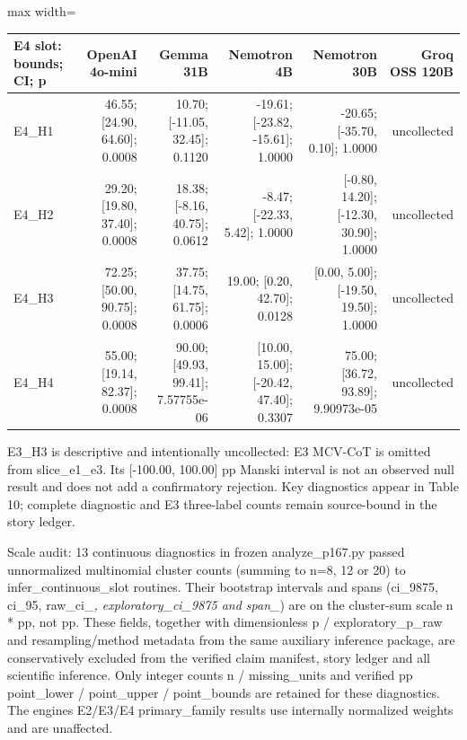 \documentclass[11pt,a4paper]{article}
\begin{document}
\begin{center}\begingroup\small\setlength{\tabcolsep}{4.5pt}\renewcommand{\arraystretch}{1.12}\begin{adjustbox}{max width=\textwidth}\begin{tabular}{lrrrrr}\toprule
\textbf{E4 slot: bounds; CI; p} & \textbf{OpenAI 4o-mini} & \textbf{Gemma 31B} & \textbf{Nemotron 4B} & \textbf{Nemotron 30B} & \textbf{Groq OSS 120B} \\ \midrule
E4\_\allowbreak{}H1 & 46.55; [24.90, 64.60]; 0.0008 & 10.70; [-11.05, 32.45]; 0.1120 & -19.61; [-23.82, -15.61]; 1.0000 & -20.65; [-35.70, 0.10]; 1.0000 & uncollected \\
E4\_\allowbreak{}H2 & 29.20; [19.80, 37.40]; 0.0008 & 18.38; [-8.16, 40.75]; 0.0612 & -8.47; [-22.33, 5.42]; 1.0000 & [-0.80, 14.20]; [-12.30, 30.90]; 1.0000 & uncollected \\
E4\_\allowbreak{}H3 & 72.25; [50.00, 90.75]; 0.0008 & 37.75; [14.75, 61.75]; 0.0006 & 19.00; [0.20, 42.70]; 0.0128 & [0.00, 5.00]; [-19.50, 19.50]; 1.0000 & uncollected \\
E4\_\allowbreak{}H4 & 55.00; [19.14, 82.37]; 0.0008 & 90.00; [49.93, 99.41]; 7.57755e-06 & [10.00, 15.00]; [-20.42, 47.40]; 0.3307 & 75.00; [36.72, 93.89]; 9.90973e-05 & uncollected \\
\bottomrule\end{tabular}\end{adjustbox}\endgroup\end{center}

E3\_\allowbreak{}H3 is descriptive and intentionally uncollected: E3 MCV-CoT is omitted from slice\_\allowbreak{}e1\_\allowbreak{}e3. Its [-100.00, 100.00] pp Manski interval is not an observed null result and does not add a confirmatory rejection. Key diagnostics appear in Table 10; complete diagnostic and E3 three-label counts remain source-bound in the story ledger.

Scale audit: 13 continuous diagnostics in frozen analyze\_\allowbreak{}p167.py passed unnormalized multinomial cluster counts (summing to n=8, 12 or 20) to infer\_\allowbreak{}continuous\_\allowbreak{}slot routines. Their bootstrap intervals and spans (ci\_\allowbreak{}9875, ci\_\allowbreak{}95, raw\_\allowbreak{}ci\_\allowbreak{}\textit{, exploratory\_\allowbreak{}ci\_\allowbreak{}9875 and span\_\allowbreak{}}) are on the cluster-sum scale n * pp, not pp. These fields, together with dimensionless p / exploratory\_\allowbreak{}p\_\allowbreak{}raw and resampling/method metadata from the same auxiliary inference package, are conservatively excluded from the verified claim manifest, story ledger and all scientific inference. Only integer counts n / missing\_\allowbreak{}units and verified pp point\_\allowbreak{}lower / point\_\allowbreak{}upper / point\_\allowbreak{}bounds are retained for these diagnostics. The engines E2/E3/E4 primary\_\allowbreak{}family results use internally normalized weights and are unaffected.
\end{document}

